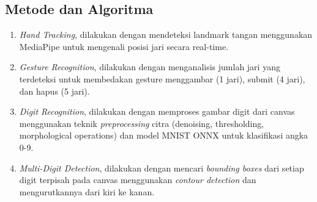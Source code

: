 \subsection{Metode dan Algoritma}

\begin{enumerate}
    \item \textit{Hand Tracking}, dilakukan dengan mendeteksi landmark tangan menggunakan MediaPipe untuk mengenali posisi jari secara real-time.
    \item \textit{Gesture Recognition}, dilakukan dengan menganalisis jumlah jari yang terdeteksi untuk membedakan gesture menggambar (1 jari), submit (4 jari), dan hapus (5 jari).
    \item \textit{Digit Recognition}, dilakukan dengan memproses gambar digit dari canvas menggunakan teknik \textit{preprocessing} citra (denoising, thresholding, morphological operations) dan model MNIST ONNX untuk klasifikasi angka 0-9.
    \item \textit{Multi-Digit Detection}, dilakukan dengan mencari \textit{bounding boxes} dari setiap digit terpisah pada canvas menggunakan \textit{contour detection} dan mengurutkannya dari kiri ke kanan.
\end{enumerate}